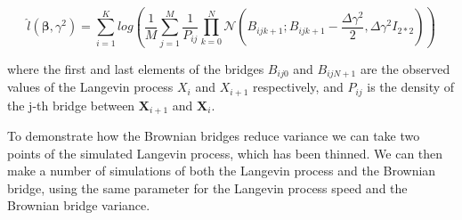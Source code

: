 $$
\hat{l}(\bm \beta, \gamma^2) = \sum_{i = 1}^K log( \frac{1}{M}\sum_{j=1}^M \frac{1}{P_{ij}}\prod_{k=0}^N \mathcal{N}(B_{ijk+1} ; B_{ijk+1} - \frac{\Delta \gamma^2}{2}, \Delta\gamma^2 I_{2*2}))
$$

where the first and last elements of the bridges $B_{ij0}$ and $B_{ijN+1}$ are the observed values of the Langevin process $X_i$ and $X_{i+1}$ respectively, and $P_{ij}$ is the density of the j-th bridge between $\textbf{X}_{i+1}$ and $\textbf{X}_i$.

To demonstrate how the Brownian bridges reduce variance we can take two points of the simulated Langevin process, which has been thinned. We can then make a number of simulations of both the Langevin process and the Brownian bridge, using the same parameter for the Langevin process speed and the Brownian bridge variance.

\

